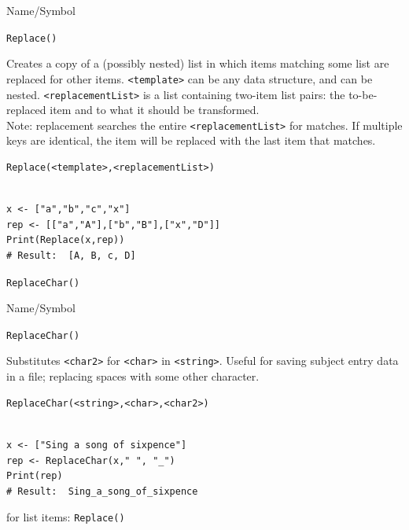 \begin{desc}{Name/Symbol}
\item[Name/Symbol] \verb+Replace()+

\item[Description]  	Creates a copy of a (possibly nested) list in which
		items matching some list are replaced for other items.  
		\verb+<template>+ can be any data structure, and can be nested.  
		\verb+<replacementList>+ is a list containing two-item list pairs:
		the to-be-replaced item and to what it should be transformed.\\
		Note: replacement searches the entire \verb+<replacementList>+ for 
		matches.  If multiple keys are identical, the item will be 
		replaced with the last item that matches.

\item[Usage]        	
\begin{verbatim}
Replace(<template>,<replacementList>)
\end{verbatim}
			  
\item[Example]     	
\begin{verbatim}

x <- ["a","b","c","x"]
rep <- [["a","A"],["b","B"],["x","D"]]
Print(Replace(x,rep))
# Result:  [A, B, c, D] 
\end{verbatim}

\item[See Also]	
\verb+ReplaceChar()+
\end{desc}

\begin{desc}{Name/Symbol}
\item[Name/Symbol]  \verb+ReplaceChar()+

\item[Description]  	Substitutes  \verb+<char2>+ for \verb+<char>+
  in \verb+<string>+. Useful for saving subject entry data in a file;
  replacing spaces with some other character.

\item[Usage]        	
\begin{verbatim}
ReplaceChar(<string>,<char>,<char2>)
\end{verbatim}
			  
\item[Example]     	
\begin{verbatim}

x <- ["Sing a song of sixpence"]
rep <- ReplaceChar(x," ", "_")
Print(rep)
# Result:  Sing_a_song_of_sixpence
\end{verbatim}

\item[See Also]	
 for list items: \verb+Replace()+ 
\end{desc}

